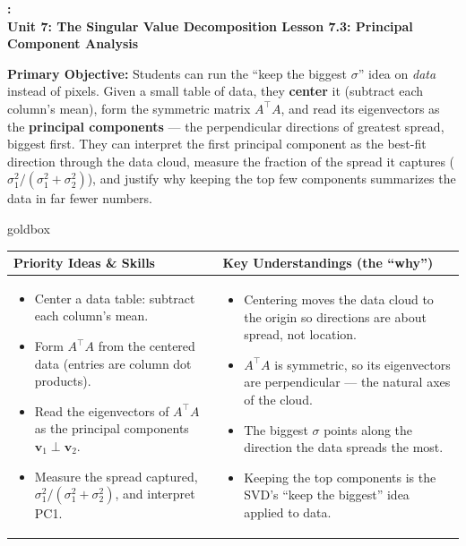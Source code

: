 \documentclass[10pt]{article}
\newcommand{\vv}{\mathbf{v}}
\newcommand{\T}{^{\top}}
\newcommand{\UnitNumberName}{Unit 7: The Singular Value Decomposition \quad}
\newcommand{\LessonNumberName}{Lesson 7.3: Principal Component Analysis}
\begin{document}
\begin{center}
    {\Large\bfseries \CourseName: \SchoolYear \\
    {\small\bfseries \UnitNumberName \LessonNumberName}}
\end{center}

\begin{tcolorbox}[colback=blush, colframe=burgundy, boxrule=0.9pt, arc=2mm,
    left=2mm, right=2mm, top=1.5mm, bottom=1.5mm]
    \textbf{Primary Objective:} Students can run the ``keep the biggest $\sigma$'' idea on \emph{data}
    instead of pixels. Given a small table of data, they \textbf{center} it (subtract each column's mean),
    form the symmetric matrix $A\T A$, and read its eigenvectors as the \textbf{principal components} ---
    the perpendicular directions of greatest spread, biggest first. They can interpret the first principal
    component as the best-fit direction through the data cloud, measure the fraction of the spread it
    captures ($\sigma_1^2/(\sigma_1^2+\sigma_2^2)$), and justify why keeping the top few components
    summarizes the data in far fewer numbers.
\end{tcolorbox}

\renewcommand{\arraystretch}{1.4}
\begin{skillbox}{goldbox}
\begin{tabularx}{\linewidth}{@{}X|X@{}}
\textbf{Priority Ideas \& Skills} & \textbf{Key Understandings (the ``why'')} \\[2pt]
\hline
\vspace{-6pt}
\begin{itemize}[leftmargin=1.1em, nosep, after=\vspace{2pt}]
  \item Center a data table: subtract each column's mean.
  \item Form $A\T A$ from the centered data (entries are column dot products).
  \item Read the eigenvectors of $A\T A$ as the principal components $\vv_1\perp\vv_2$.
  \item Measure the spread captured, $\sigma_1^2/(\sigma_1^2+\sigma_2^2)$, and interpret PC1.
\end{itemize}
&
\vspace{-6pt}
\begin{itemize}[leftmargin=1.1em, nosep, after=\vspace{2pt}]
  \item Centering moves the data cloud to the origin so directions are about spread, not location.
  \item $A\T A$ is symmetric, so its eigenvectors are perpendicular --- the natural axes of the cloud.
  \item The biggest $\sigma$ points along the direction the data spreads the most.
  \item Keeping the top components is the SVD's ``keep the biggest'' idea applied to data.
\end{itemize}
\end{tabularx}
\end{skillbox}
\end{document}
